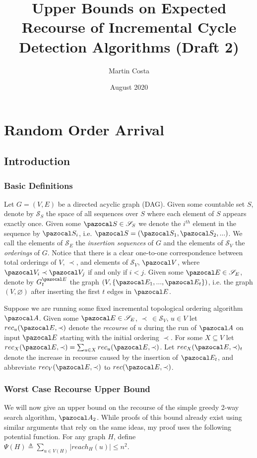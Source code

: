 \documentclass{report}
\title{Upper Bounds on Expected Recourse of Incremental Cycle Detection Algorithms (Draft 2)}
\author{Martin Costa}
\date{August 2020}
\begin{document}
\chapter{Random Order Arrival}

\section{Introduction}

\subsection{Basic Definitions}

Let $G=(V,E)$ be a directed acyclic graph (DAG). Given some countable set $S$, denote by $\mathcal{S}_{S}$ the space of all sequences over $S$ where each element of $S$ appears exactly once. Given some $\pazocal S \in \mathcal S_S$ we denote the $i^{th}$ element in the sequence by $\pazocal S_i$, i.e. $\pazocal S = (\pazocal S_1, \pazocal S_2,...)$. We call the elements of $\mathcal S_E$ the \textit{insertion sequences} of $G$ and the elements of $\mathcal S_V$ the \textit{orderings} of $G$. Notice that there is a clear one-to-one correspondence between total orderings of $V$, $\prec$, and elements of $\mathcal S_V$, $\pazocal V$, where $\pazocal V_i \prec \pazocal V_j$ if and only if $i < j$. Given some $\pazocal E \in \mathcal S_E$, denote by $G^{\pazocal E}_t$ the graph $(V, \{\pazocal E_1,..., \pazocal E_t \})$, i.e. the graph $(V, \varnothing)$ after inserting the first $t$ edges in $\pazocal E$.

Suppose we are running some fixed incremental topological ordering algorithm $\pazocal A$. Given some $\pazocal E \in \mathcal S_E$, $\prec \: \in \mathcal S_V$, $u \in V$ let $rec_u(\pazocal E, \prec)$ denote the \textit{recourse} of $u$ during the run of $\pazocal A$ on input $\pazocal E$ starting with the initial ordering $\prec$. For some $X \subseteq V$ let $rec_X(\pazocal E, \prec) = \sum_{u \in X} rec_u(\pazocal E, \prec)$. Let $rec_X(\pazocal E, \prec)_t$ denote the increase in recourse caused by the insertion of $\pazocal E_t$, and abbreviate $rec_V(\pazocal E, \prec)$ to $rec(\pazocal E, \prec)$.

\subsection{Worst Case Recourse Upper Bound}

We will now give an upper bound on the recourse of the simple greedy 2-way search algorithm, $\pazocal A_2$. While proofs of this bound already exist using similar arguments that rely on the same ideas, my proof uses the following potential function. For any graph $H$, define $\Psi(H) \triangleq \sum_{u \in V(H)}\vert reach_{H}(u) \vert \leq n^{2}$.
\end{document}
